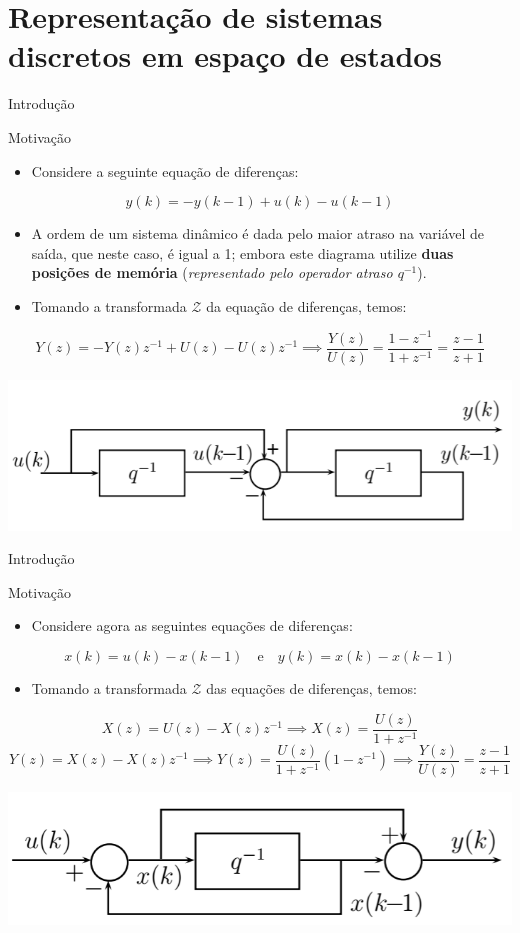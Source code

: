 \section{Representação de sistemas discretos em espaço de estados}

\begin{frame}{Introdução}
\begin{block}{Motivação}
	\begin{itemize}
		\item Considere a seguinte equação de diferenças:
	\end{itemize}
$$y(k) = -y(k-1) + u(k) -u(k-1)$$
\vspace{-0.3cm}
	\begin{itemize}
		\item A ordem de um sistema dinâmico é dada pelo maior atraso na variável de saída, que neste caso, é igual a 1; embora este diagrama utilize \textbf{duas posições de memória} (\textit{representado pelo operador atraso $q^{-1}$}).
		\item Tomando a transformada $\mathcal{Z}$ da equação de diferenças, temos:
	\end{itemize}
$$Y(z) = -Y(z)z^{-1} + U(z) - U(z)z^{-1} \implies \dfrac{Y(z)}{U(z)} = \dfrac{1-z^{-1}}{1+z^{-1} } = \dfrac{z-1}{z+1}$$
\end{block}
\centerline{\includegraphics[width=0.65\linewidth]{Figuras/Ch14/fig1.PNG}}
\end{frame}

\begin{frame}{Introdução}
\begin{block}{Motivação}
	\begin{itemize}
		\item Considere agora as seguintes equações de diferenças:
	\end{itemize}
$$x(k) = u(k) -x(k-1) \quad \text{e} \quad y(k) = x(k) - x(k-1)$$
\vspace{-0.3cm}
	\begin{itemize}
		\item Tomando a transformada $\mathcal{Z}$ das equações de diferenças, temos:
	\end{itemize}
$$X(z) = U(z) - X(z)z^{-1} \implies X(z) = \dfrac{U(z)}{1+z^{-1}}$$
$$Y(z) = X(z) - X(z)z^{-1} \implies Y(z) = \dfrac{U(z)}{1+z^{-1}}{(1-z^{-1})} \implies \dfrac{Y(z)}{U(z)} = \dfrac{z-1}{z+1}$$
\end{block}
\vspace{0.2cm}
\centerline{\includegraphics[width=0.6\linewidth]{Figuras/Ch14/fig2.PNG}}
\end{frame}

